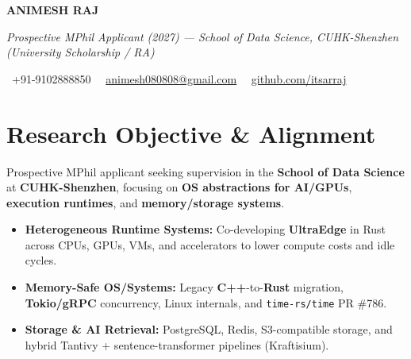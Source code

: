 \documentclass[a4paper,11pt]{article}
\newcommand{\socialicon}[1]{\raisebox{-0.05em}{\resizebox{!}{1em}{#1}}}
\newcommand{\headerfontiii}{\fontfamily{ppl}\selectfont} %
\begin{document}
\headerfontiii

\begin{center}
    {\Huge\textbf{ANIMESH RAJ}}
\end{center}
\vspace{-6mm}

\begin{center}
    {\small\textit{Prospective MPhil Applicant (2027) --- School of Data Science, CUHK-Shenzhen (University Scholarship / RA)}}
\end{center}
\vspace{-6mm}

\begin{center}
    {\small
    \socialicon{\faPhone}\ +91-9102888850 \textbar\ 
    \socialicon{\faEnvelope}\ \href{mailto:animesh080808@gmail.com}{animesh080808@gmail.com} \textbar\ 
    \socialicon{\faGithub}\ \href{https://github.com/itsarraj}{github.com/itsarraj}
    }
\end{center}
\vspace{-4mm}

\section{\textbf{Research Objective \& Alignment}}
\vspace{1mm}
{\small
Prospective MPhil applicant seeking supervision in the \textbf{School of Data Science} at \textbf{CUHK-Shenzhen}, focusing on \textbf{OS abstractions for AI/GPUs}, \textbf{execution runtimes}, and \textbf{memory/storage systems}.
\begin{itemize}[leftmargin=3ex, itemsep=0.4mm, topsep=1mm]
    \item \textbf{Heterogeneous Runtime Systems:} Co-developing \textbf{UltraEdge} in Rust across CPUs, GPUs, VMs, and accelerators to lower compute costs and idle cycles.
    \item \textbf{Memory-Safe OS/Systems:} Legacy \textbf{C++}-to-\textbf{Rust} migration, \textbf{Tokio/gRPC} concurrency, Linux internals, and \texttt{time-rs/time} PR \#786.
    \item \textbf{Storage \& AI Retrieval:} PostgreSQL, Redis, S3-compatible storage, and hybrid Tantivy + sentence-transformer pipelines (Kraftisium).
\end{itemize}
}
\vspace{-3mm}
\end{document}
